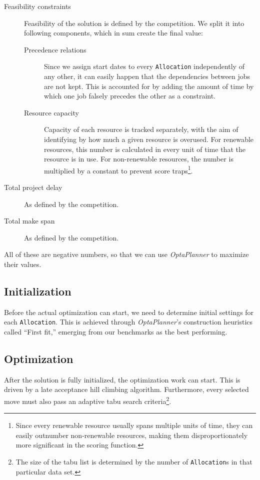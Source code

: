 \documentclass[draft]{svjour3}
\begin{document}
\begin{description}
\item[Feasibility constraints] Feasibility of the solution is defined by the competition. We split it into following components, which in sum create the final value:

\begin{description}
\item[Precedence relations] Since we assign start dates to every \texttt{Allocation} independently of any other, it can easily happen that the dependencies between jobs are not kept. This is accounted for by adding the amount of time by which one job falsely precedes the other as a constraint.
\item[Resource capacity] Capacity of each resource is tracked separately, with the aim of identifying by how much a given resource is overused. For renewable resources, this number is calculated in every unit of time that the resource is in use. For non-renewable resources, the number is multiplied by a constant to prevent score traps\footnote{Since every renewable resource usually spans multiple units of time, they can easily outnumber non-renewable resources, making them disproportionately more significant in the scoring function.}.
\end{description}

\item[Total project delay] As defined by the competition.
\item[Total make span] As defined by the competition.
\end{description}

All of these are negative numbers, so that we can use \textit{OptaPlanner} to maximize their values.

\subsection{Initialization}

Before the actual optimization can start, we need to determine initial settings for each \texttt{Allocation}. This is achieved through \textit{OptaPlanner}'s construction heuristics called ``First fit,'' emerging from our benchmarks as the best performing.

\subsection{Optimization}

After the solution is fully initialized, the optimization work can start. This is driven by a late acceptance hill climbing algorithm. Furthermore, every selected move must also pass an adaptive tabu search criteria\footnote{The size of the tabu list is determined by the number of \texttt{Allocation}s in that particular data set.}.
\end{document}
